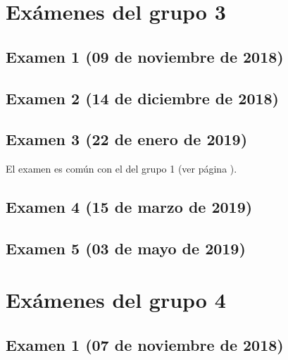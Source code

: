 \documentclass[a4paper,12pt,twoside]{book}
\begin{document}
\chapter{Exámenes del grupo 3}
\section{Examen 1 (09 de noviembre de 2018)}
\section{Examen 2 (14 de diciembre de 2018)}
\section{Examen 3 (22 de enero de 2019)}
El examen es común con el del grupo 1 (ver página \pageref{examen_18_19_1_3}).
\section{Examen 4 (15 de marzo de 2019)}
\section{Examen 5 (03 de mayo de 2019)}

\chapter{Exámenes del grupo 4}
\section{Examen 1 (07 de noviembre de 2018)}
\end{document}
